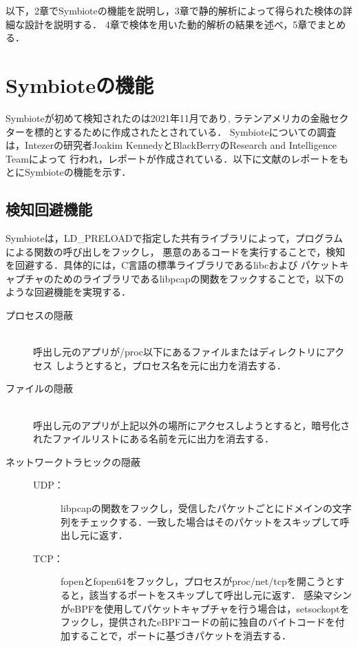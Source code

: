 \documentclass[submit,techreq,noauthor]{eco}	%
\begin{document}
以下，2章でSymbioteの機能を説明し，3章で静的解析によって得られた検体の詳細な設計を説明する．
4章で検体を用いた動的解析の結果を述べ，5章でまとめる．\\


\section{Symbioteの機能}
Symbioteが初めて検知されたのは2021年11月であり,
ラテンアメリカの金融セクターを標的とするために作成されたとされている．
Symbioteについての調査は，Intezerの研究者Joakim KennedyとBlackBerryのResearch and Intelligence Teamによって
行われ，レポートが作成されている．以下に文献\cite{Symbiote}のレポートをもとにSymbioteの機能を示す．


\subsection{検知回避機能}
Symbioteは，LD\_PRELOADで指定した共有ライブラリによって，プログラムによる関数の呼び出しをフックし，
悪意のあるコードを実行することで，検知を回避する．具体的には，C言語の標準ライブラリであるlibcおよび
パケットキャプチャのためのライブラリであるlibpcapの関数をフックすることで，以下のような回避機能を実現する．
  \begin{description}
    \item [プロセスの隠蔽] \mbox{}\\
    呼出し元のアプリが/proc以下にあるファイルまたはディレクトリにアクセス
    しようとすると，プロセス名を元に出力を消去する．
    \item [ファイルの隠蔽] \mbox{}\\
    呼出し元のアプリが上記以外の場所にアクセスしようとすると，暗号化さ
    れたファイルリストにある名前を元に出力を消去する．
    \item [ネットワークトラヒックの隠蔽] \mbox{}
      \begin{description}
        \item[UDP：] 
        libpcapの関数をフックし，受信したパケットごとにドメインの文字列をチェックする．一致した場合はそのパケットをスキップして呼出し元に返す．
        \item[TCP：] 
        fopenとfopen64をフックし，プロセスがproc/net/tcpを開こうとすると，該当するポートをスキップして呼出し元に返す．
        感染マシンがeBPFを使用してパケットキャプチャを行う場合は，setsockoptをフックし，提供されたeBPFコードの前に独自のバイトコードを付加することで，ポートに基づきパケットを消去する．
      \end{description}
  \end{description}
\end{document}
